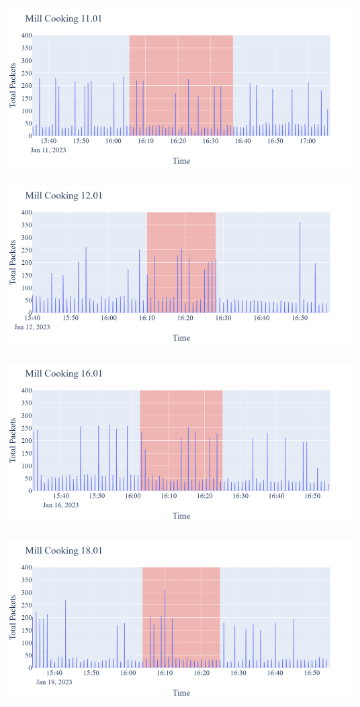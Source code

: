 \begin{figure}[H]
\begin{subfigure}[b]{0.5\textwidth}
        \centering
        \includegraphics[width=1.2\hsize]{figures/Mill_Cooking_Packets_11.01.png}
    \end{subfigure}
    \begin{subfigure}[b]{0.5\textwidth}
        \centering
        \includegraphics[width=1.2\hsize]{figures/Mill_Cooking_Packets_12.01.png}
    \end{subfigure}
    \begin{subfigure}[b]{0.5\textwidth}
        \centering
        \includegraphics[width=1.2\hsize]{figures/Mill_Cooking_Packets_16.01.png}
    \end{subfigure}
    \begin{subfigure}[b]{0.5\textwidth}
        \centering
        \includegraphics[width=1.2\hsize]{figures/Mill_Cooking_Packets_18.01.png}

\end{subfigure}
\end{figure}
